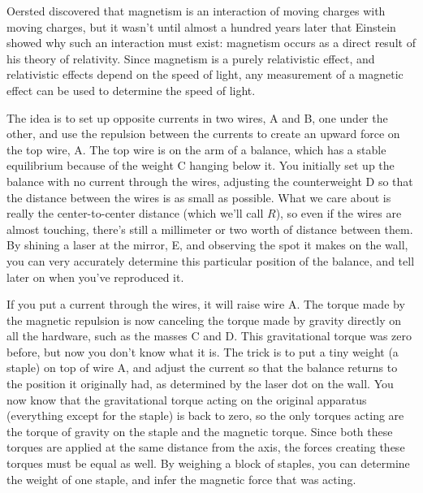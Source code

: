 \label{lab:relativity}

\apparatus
{}


\introduction

Oersted discovered that magnetism is an interaction of moving
charges with moving charges, but it wasn't until almost a hundred
years later that Einstein showed why such an interaction must
exist: magnetism occurs as a direct result of his theory of
relativity. Since magnetism is a purely relativistic effect,
and relativistic effects depend on the speed of light, any
measurement of a magnetic effect can be used to determine the
speed of light.

\setup

The idea is to set up opposite currents in two wires, A and B, one under
the other, and use the repulsion between the currents to create an upward force on
the top wire, A. The top wire is on the arm of a balance, which has
a stable equilibrium because of the weight C hanging below it. 
You initially set up the balance with no current through the wires,
adjusting the counterweight D so that the distance between the wires
is as small as possible. What we care about is
really the center-to-center distance (which we'll call $R$),
so even if the wires are almost touching, there's still
a millimeter or two worth of distance between them. By shining a laser at
the mirror, E, and observing the spot it makes on the wall, you can very
accurately determine this particular position of the balance, and tell later
on when you've reproduced it.


If you put a current through the wires, it will raise wire A. The
torque made by the magnetic repulsion is now canceling the torque made
by gravity directly on all the hardware, such as the masses C and D.
This gravitational torque was zero before, but now you don't know what it
is. The trick is to put a tiny weight (a staple) on top of wire A, and
adjust the current so that the balance returns to the position it originally
had, as determined by the laser dot on the wall. You now know that the
gravitational torque acting on the original apparatus (everything except
for the staple) is back to zero, so the only torques acting are the torque
of gravity on the staple and the magnetic torque. Since both these torques
are applied at the same distance from the axis, the forces creating these
torques must be equal as well. By weighing a block of staples, you can
determine the weight of one staple, and infer the magnetic force that was
acting.

